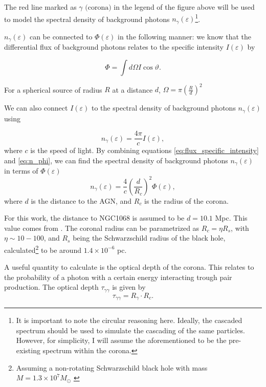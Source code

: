 The red line marked as $\gamma \text{ (corona)}$ in the legend of the figure above will be used to model the spectral density of background photons $n_{\gamma}(\varepsilon)$\footnote{It is important to note the circular reasoning here. Ideally, the cascaded spectrum should be used to simulate the cascading of the same particles. However, for simplicity, I will assume the aforementioned to be the pre-existing spectrum within the corona.}.

$n_{\gamma}(\varepsilon)$ can be connected to $\Phi(\varepsilon)$ in the following manner: we know that the differential flux of background photons relates to the specific intensity $I(\varepsilon)$ by

\begin{equation}
    \Phi = \int d\Omega I \cos \vartheta.
    \label{eq:flux_specific_intensity}
\end{equation}

For a spherical source of radius $R$ at a distance $d$, $\Omega = \pi \left(\frac{R}{d}\right)^2$

We can also connect $I(\varepsilon)$ to the spectral density of background photons $n_{\gamma}(\varepsilon)$ using

\begin{equation}
    n_{\gamma}(\varepsilon) = \frac{4\pi}{c}I(\varepsilon),
    \label{eq:n_phi}
\end{equation} where $c$ is the speed of light. By combining equations \eqref{eq:flux_specific_intensity} and \eqref{eq:n_phi}, we can find the spectral density of background photons $n_{\gamma}(\varepsilon)$ in terms of $\Phi(\varepsilon)$
\begin{equation}
    n_{\gamma}(\varepsilon) = \frac{4}{c}\left(\frac{d}{R_c}\right)^2\Phi(\varepsilon),
    \label{eq:n_gamma}
\end{equation}
where $d$ is the distance to the AGN, and $R_c$ is the radius of the corona.

For this work, the distance to NGC1068 is assumed to be $d = 10.1$ Mpc. This value comes from \citet{padovani2024highenergyneutrinosvicinitysupermassive}. The coronal radius can be parametrized as $R_c = \eta R_s$, with $\eta \sim 10 - 100$, and $R_s$ being the Schwarzschild radius of the black hole, calculated\footnote{Assuming a non-rotating Schwarzschild black hole with mass $M = 1.3 \times 10^7 M_{\odot}$ \citep{Blackhole}} to be around $1.4 \times 10^{-6}$ pc.

A useful quantity to calculate is the optical depth of the corona. This relates to the probability of a photon with a certain energy interacting trough pair production. The optical depth $\tau_{\gamma\gamma}$ is given by 
\begin{equation*}
    \tau_{\gamma\gamma} = R_{\gamma} \cdot  R_c.
\end{equation*}


